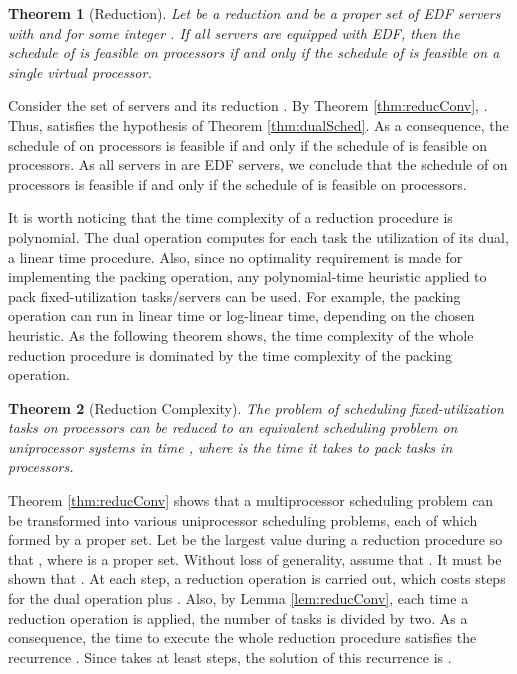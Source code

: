 \documentclass[twocolumn, compsocconf]{IEEEtran}
\newtheorem{theorem}{Theorem}[section]
\newcounter{proc}
\newcounter{step}
\begin{document}
\begin{theorem}[Reduction]\label{thm:reduction}
  Let  be a reduction and  be a proper
  set of EDF servers with  and  for some integer . If all servers are equipped with
  EDF, then the schedule  of  is feasible on
   processors if and only if the schedule  of  is feasible on a single virtual processor.
\end{theorem}

\begin{IEEEproof}
  Consider the set of servers  and its
  reduction . By Theorem \ref{thm:reducConv},
  . Thus,  satisfies the
  hypothesis of Theorem \ref{thm:dualSched}. As a consequence, the schedule
   of  on  processors is feasible if and only if the schedule
   of  is feasible on
   processors.  As all servers in 
  are EDF servers, we conclude that the schedule  of
   on 
  processors is feasible if and only if the schedule  of
   is feasible on  processors.
\end{IEEEproof}

It is worth noticing that the time complexity of a reduction procedure is
polynomial. The dual operation computes for each task the utilization of its
dual, a linear time procedure. Also, since no optimality requirement is made for
implementing the packing operation, any polynomial-time heuristic applied to
pack fixed-utilization tasks/servers can be used. For example, the packing
operation can run in linear time or log-linear time, depending on the chosen
heuristic. As the following theorem shows, the time complexity of the whole
reduction procedure is dominated by the time complexity of the packing
operation.

\begin{theorem}[Reduction Complexity]\label{thm:complexity}
  The problem of scheduling  fixed-utilization tasks on  processors can be
  reduced to an equivalent scheduling problem on uniprocessor systems in time
  , where  is the time it takes to pack  tasks in 
  processors.
\end{theorem}

\begin{IEEEproof}
  Theorem \ref{thm:reducConv} shows that a multiprocessor scheduling problem can
  be transformed into various uniprocessor scheduling problems, each of which
  formed by a proper set. Let  be the largest value during a reduction
  procedure so that , where  is a
  proper set. Without loss of generality, assume that . It must
  be shown that . At each step, a reduction operation is carried
  out, which costs  steps for the dual operation plus .  Also, by Lemma
  \ref{lem:reducConv}, each time a reduction operation is applied, the number of
  tasks is divided by two. As a consequence, the time  to execute the
  whole reduction procedure satisfies the recurrence . Since  takes at least  steps, the solution of this recurrence
  is .
\end{IEEEproof}
\end{document}

